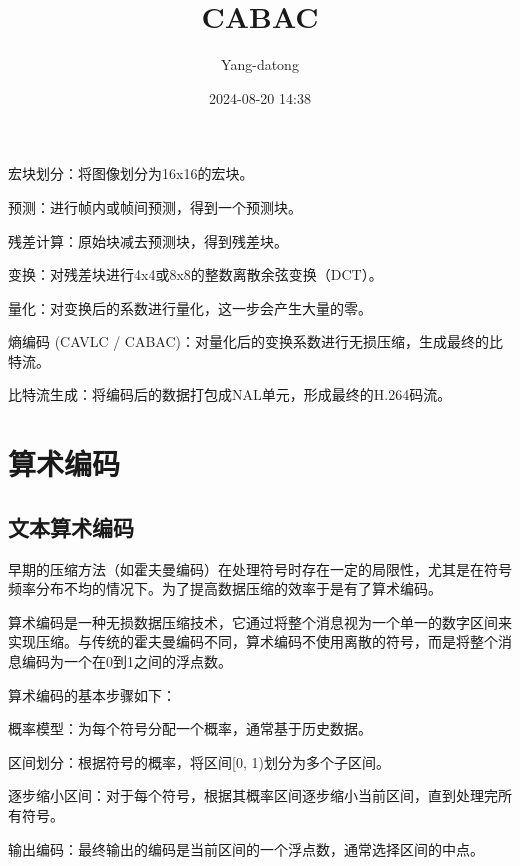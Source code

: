 \documentclass{/Users/hi/Study/template/code}
\title{CABAC}
\author{\textcopyright Yang-datong }
\date{2024-08-20 14:38}
\begin{document}
\makehead


\begin{serialNumber}
	\item 宏块划分：将图像划分为16x16的宏块。
	\item 预测：进行帧内或帧间预测，得到一个预测块。
	\item 残差计算：原始块减去预测块，得到残差块。
	\item 变换：对残差块进行4x4或8x8的整数离散余弦变换（DCT）。
	\item 量化：对变换后的系数进行量化，这一步会产生大量的零。
	\item 熵编码 (CAVLC / CABAC)：对量化后的变换系数进行无损压缩，生成最终的比特流。
	\item 比特流生成：将编码后的数据打包成NAL单元，形成最终的H.264码流。
\end{serialNumber}



\section{算术编码}
\subsection{文本算术编码}
早期的压缩方法（如霍夫曼编码）在处理符号时存在一定的局限性，尤其是在符号频率分布不均的情况下。为了提高数据压缩的效率于是有了算术编码。

算术编码是一种无损数据压缩技术，它通过将整个消息视为一个单一的数字区间来实现压缩。与传统的霍夫曼编码不同，算术编码不使用离散的符号，而是将整个消息编码为一个在0到1之间的浮点数。

算术编码的基本步骤如下：
\begin{serialNumber}
	\item 概率模型：为每个符号分配一个概率，通常基于历史数据。
	\item 区间划分：根据符号的概率，将区间[0, 1)划分为多个子区间。
	\item 逐步缩小区间：对于每个符号，根据其概率区间逐步缩小当前区间，直到处理完所有符号。
	\item 输出编码：最终输出的编码是当前区间的一个浮点数，通常选择区间的中点。
\end{serialNumber}
\end{document}
